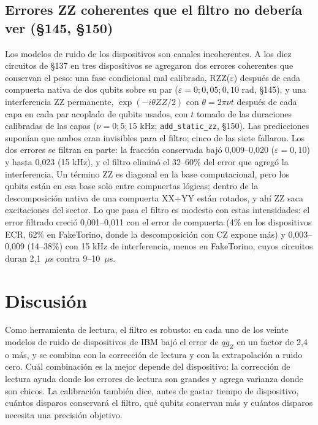 \documentclass[11pt]{article}
\newcommand{\qZ}{qg_Z}
\begin{document}
\subsection{Errores ZZ coherentes que el filtro no debería ver (§145, §150)}

Los modelos de ruido de los dispositivos son canales incoherentes. A los diez circuitos de §137 en tres
dispositivos se agregaron dos errores coherentes que conservan el peso: una fase condicional mal calibrada,
RZZ($\varepsilon$) después de cada compuerta nativa de dos qubits sobre su par ($\varepsilon=0;0{,}05;0{,}10$ rad,
§145), y una interferencia ZZ permanente, $\exp(-i\theta ZZ/2)$ con $\theta=2\pi\nu t$ después de cada capa en
cada par acoplado de qubits usados, con $t$ tomado de las duraciones calibradas de las capas ($\nu=0;5;15$ kHz;
\texttt{add\_static\_zz}, §150). Las predicciones suponían que ambos eran invisibles para el filtro; cinco de las
siete fallaron. Los dos errores se filtran en parte: la fracción conservada bajó 0{,}009--0{,}020
($\varepsilon=0{,}10$) y hasta 0{,}023 (15 kHz), y el filtro eliminó el 32--60\% del error que agregó la
interferencia. Un término ZZ es diagonal en la base computacional, pero los qubits están en esa base solo
entre compuertas lógicas; dentro de la descomposición nativa de una compuerta XX+YY están rotados, y ahí ZZ
saca excitaciones del sector. Lo que pasa el filtro es modesto con estas intensidades: el error filtrado
creció 0{,}001--0{,}011 con el error de compuerta (4\% en los dispositivos ECR, 62\% en FakeTorino, donde la
descomposición con CZ expone más) y 0{,}003--0{,}009 (14--38\%) con 15 kHz de interferencia, menos en FakeTorino,
cuyos circuitos duran 2{,}1~$\mu$s contra 9--10~$\mu$s.

\section{Discusión}

Como herramienta de lectura, el filtro es robusto: en cada uno de los veinte modelos de ruido de
dispositivos de IBM bajó el error de $\qZ$ en un factor de 2{,}4 o más, y se combina con la corrección de
lectura y con la extrapolación a ruido cero. Cuál combinación es la mejor depende del dispositivo: la
corrección de lectura ayuda donde los errores de lectura son grandes y agrega varianza donde son chicos. La
calibración también dice, antes de gastar tiempo de dispositivo, cuántos disparos conservará el filtro, qué
qubits conservan más y cuántos disparos necesita una precisión objetivo.
\end{document}
